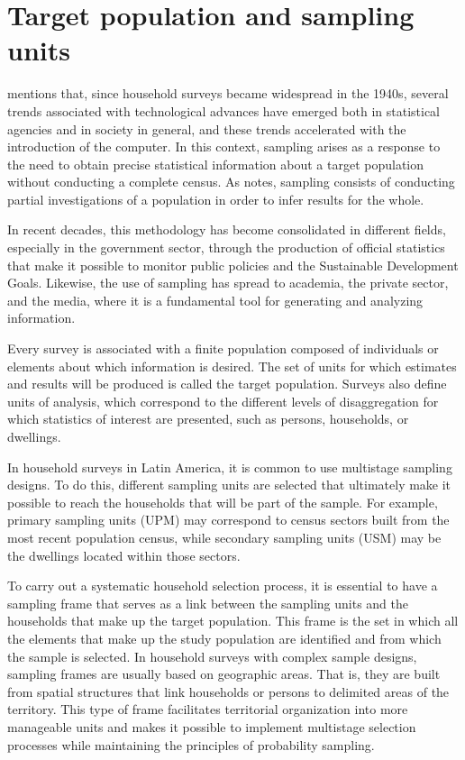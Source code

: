 \documentclass[
  english,
  12pt,
]{book}
\begin{document}
\section{Target population and sampling units}\label{poblacion-objetivo-y-unidades-de-muestreo}

\citet{gambino2009sampling} mentions that, since household surveys became widespread in the 1940s, several trends associated with technological advances have emerged both in statistical agencies and in society in general, and these trends accelerated with the introduction of the computer. In this context, sampling arises as a response to the need to obtain precise statistical information about a target population without conducting a complete census. As \citet{Gutierrez2016} notes, sampling consists of conducting partial investigations of a population in order to infer results for the whole.

In recent decades, this methodology has become consolidated in different fields, especially in the government sector, through the production of official statistics that make it possible to monitor public policies and the Sustainable Development Goals. Likewise, the use of sampling has spread to academia, the private sector, and the media, where it is a fundamental tool for generating and analyzing information.

Every survey is associated with a finite population composed of individuals or elements about which information is desired. The set of units for which estimates and results will be produced is called the target population. Surveys also define units of analysis, which correspond to the different levels of disaggregation for which statistics of interest are presented, such as persons, households, or dwellings.

In household surveys in Latin America, it is common to use multistage sampling designs. To do this, different sampling units are selected that ultimately make it possible to reach the households that will be part of the sample. For example, primary sampling units (UPM) may correspond to census sectors built from the most recent population census, while secondary sampling units (USM) may be the dwellings located within those sectors.

To carry out a systematic household selection process, it is essential to have a sampling frame that serves as a link between the sampling units and the households that make up the target population. This frame is the set in which all the elements that make up the study population are identified and from which the sample is selected. In household surveys with complex sample designs, sampling frames are usually based on geographic areas. That is, they are built from spatial structures that link households or persons to delimited areas of the territory. This type of frame facilitates territorial organization into more manageable units and makes it possible to implement multistage selection processes while maintaining the principles of probability sampling.
\end{document}
